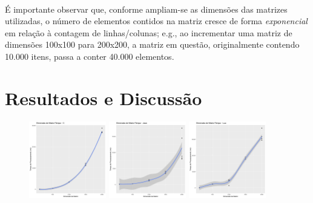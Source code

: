 \documentclass[11pt]{article}
\begin{document}
\paragraph{}
É importante observar que, conforme ampliam-se as dimensões das matrizes
utilizadas, o número de elementos contidos na matriz cresce de forma
\textit{exponencial} em relação à contagem de linhas/colunas; e.g., ao
incrementar uma matriz de dimensões 100x100 para 200x200, a matriz em questão,
originalmente contendo 10.000 itens, passa a conter 40.000 elementos.

\newpage
\section{Resultados e Discussão}

\begin{figure}[!ht]
    \centering
    \includegraphics[width =0.3\textwidth]{plot_c.png}
    \includegraphics[width =0.3\textwidth]{plot_java.png}
    \includegraphics[width =0.3\textwidth]{plot_lua.png}
\end{figure}
\end{document}
